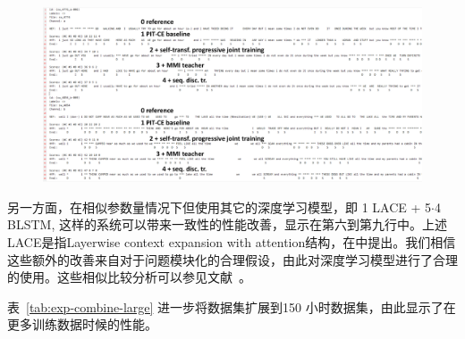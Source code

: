 \begin{figure}[!htp]
  \centering
    \captionstyle{\centering}
    \includegraphics[width=\textwidth]{figure/pit-example.pdf}
\end{figure}


另一方面，在相似参数量情况下但使用其它的深度学习模型，即 {1 LACE + 5$\cdot$4 BLSTM}, 这样的系统可以带来一致性的性能改善，显示在第六到第九行中。上述LACE是指Layerwise context expansion with attention结构，在\cite{LACE-yu2016}中提出。我们相信这些额外的改善来自对于问题模块化的合理假设，由此对深度学习模型进行了合理的使用。这些相似比较分析可以参见文献~\cite{chen2018progressive}。



表~\ref{tab:exp-combine-large} 进一步将数据集扩展到150 小时数据集，由此显示了在更多训练数据时候的性能。

